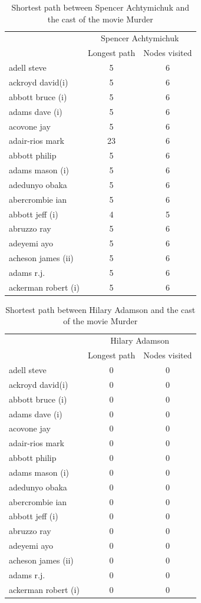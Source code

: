 \documentclass[12pt]{ieeeconf}      %
\begin{document}
\begin{table}[H]
\centering
\caption{Shortest path between Spencer Achtymichuk and the cast of the movie Murder}
\label{table:spencer}
\begin{tabular}{lcc}
 & \multicolumn{2}{c}{Spencer Achtymichuk} \\
 & Longest path & Nodes visited \\
adell steve & 5 & 6 \\
ackroyd david(i) & 5 & 6 \\
abbott bruce (i) & 5 & 6 \\
adams dave (i) & 5 & 6 \\
acovone jay & 5 & 6 \\
adair-rios mark & 23 & 6 \\
abbott philip & 5 & 6 \\
adams mason (i) & 5 & 6 \\
adedunyo obaka & 5 & 6 \\
abercrombie ian & 5 & 6 \\
abbott jeff (i) & 4 & 5 \\
abruzzo ray & 5 & 6 \\
adeyemi ayo & 5 & 6 \\
acheson james (ii) & 5 & 6 \\
adams r.j. & 5 & 6 \\
ackerman robert (i) & 5 & 6
\end{tabular}
\end{table}

\begin{table}[H]
\centering
\caption{Shortest path between Hilary Adamson and the cast of the movie Murder}
\label{table:hilary}
\begin{tabular}{lcc}
 & \multicolumn{2}{c}{Hilary Adamson} \\
 & Longest path & Nodes visited \\
adell steve & 0 & 0 \\
ackroyd david(i) & 0 & 0 \\
abbott bruce (i) & 0 & 0 \\
adams dave (i) & 0 & 0 \\
acovone jay & 0 & 0 \\
adair-rios mark & 0 & 0 \\
abbott philip & 0 & 0 \\
adams mason (i) & 0 & 0 \\
adedunyo obaka & 0 & 0 \\
abercrombie ian & 0 & 0 \\
abbott jeff (i) & 0 & 0 \\
abruzzo ray & 0 & 0 \\
adeyemi ayo & 0 & 0 \\
acheson james (ii) & 0 & 0 \\
adams r.j. & 0 & 0 \\
ackerman robert (i) & 0 & 0
\end{tabular}
\end{table}
\end{document}
